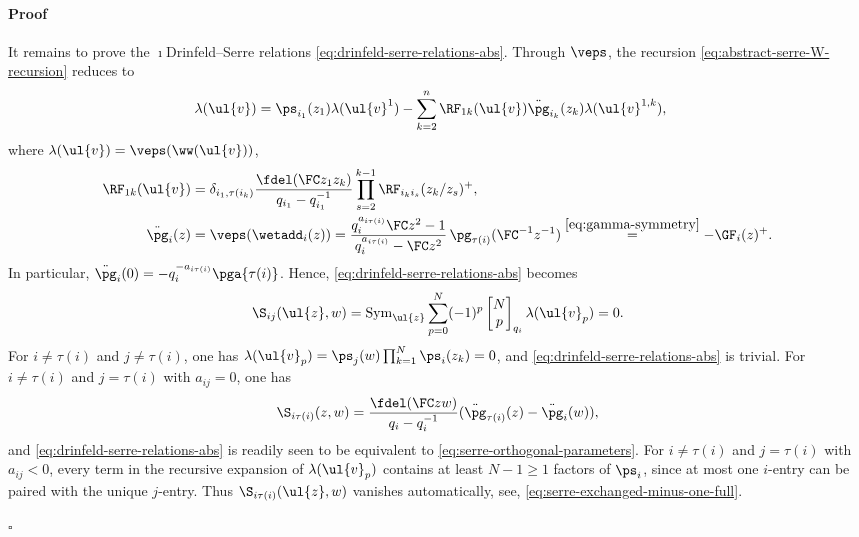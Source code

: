 \documentclass[reqno]{amsart}
\numberwithin{equation}{section}
\newenvironment{pf}{\medskip\paragraph{{\sc Proof}}}{\hfill$\square$\par\medskip}
\begin{document}
\begin{pf}
It remains to prove the $\imath$Drinfeld--Serre relations
\eqref{eq:drinfeld-serre-relations-abs}. Through $\veps$, the recursion 
\eqref{eq:abstract-serre-W-recursion} reduces to 
\begin{equation}\label{eq:serre-scalar-recursion}
\begin{aligned}
	\lambda(\ul{v})={}&\ps_{i_1}(z_1)\lambda(\ul{v}^1)
	-\sum_{k=2}^n
	\RF_{1k}(\ul{v})\ddot{\pg}_{i_k}(z_k)
	\lambda(\ul{v}^{1,k}),
\end{aligned}
\end{equation}
where $\lambda(\ul{v})=\veps(\ww(\ul{v}))$,
\begin{align}
\label{eq:serre-contraction-kernel}
\RF_{1k}(\ul{v})&=
\delta_{i_1,\tau(i_k)}\frac{\fdel(\FC z_1z_k)}
{q_{i_1}-q_{i_1}^{-1}}
\prod_{s=2}^{k-1}
\RF_{i_k i_s}(z_k/z_s)^+,\\
\label{eq:serre-scalar-cartan}
\ddot{\pg}_i(z)&=\veps(\wetadd_i(z))=
\frac{q_i^{a_{i\tau(i)}}\FC z^2-1}
{q_i^{a_{i\tau(i)}}-\FC z^2}\,
\pg_{\tau(i)}(\FC^{-1}z^{-1})
\stackrel{\eqref{eq:gamma-symmetry}}{=}-\GF_i(z)^+.
\end{align}
In particular, $\ddot{\pg}_i(0)=-q_i^{-a_{i\tau(i)}}\pga{\tau(i)}$. Hence, \eqref{eq:drinfeld-serre-relations-abs} becomes
\begin{equation}\label{eq:scalar-serre}
	\S_{ij}(\ul{z}, w)=\operatorname{Sym}_{\ul{z}}
	\sum_{p=0}^{N}
	(-1)^p
	\begin{bmatrix}N\\ p\end{bmatrix}_{q_i}
	\lambda(\ul{v}_p)
	=0.
\end{equation}
For $i\neq\tau(i)$ and $j\neq\tau(i)$, one has 
$\lambda(\ul{v}_p)=\ps_j(w)\prod_{k=1}^N\ps_{i}(z_k)=0$, and \eqref{eq:drinfeld-serre-relations-abs} is trivial.
For $i\neq\tau(i)$ and $j=\tau(i)$ with $a_{ij}=0$, one has
\begin{equation}
\S_{i\tau(i)}(z, w)=\frac{\fdel(\FC zw)}{q_i-q_i^{-1}}(\ddot{\pg}_{\tau(i)}(z)-\ddot{\pg}_i(w)),
\end{equation}
and \eqref{eq:drinfeld-serre-relations-abs} is readily seen to be equivalent to \eqref{eq:serre-orthogonal-parameters}. 
For $i\neq\tau(i)$ and $j=\tau(i)$ with $a_{ij}<0$, every term in the recursive expansion of $\lambda(\ul{v}_p)$ contains at least $N-1\geqslant1$ factors of $\ps_i$, since at most one $i$-entry can be paired with the unique $j$-entry. Thus $\S_{i\tau(i)}(\ul{z}, w)$ vanishes automatically,
see, \eg \eqref{eq:serre-exchanged-minus-one-full}.


\end{pf}
\end{document}
